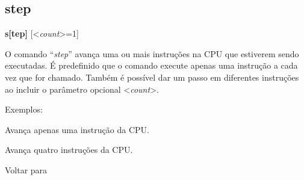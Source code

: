 \documentclass[letterpaper,10pt,brazil]{sphinxmanual}
\begin{document}
\subsection{step}
\label{debugger/execution:debugger-command-step}\label{debugger/execution:step}
\begin{DUlineblock}{0em}
\item[]
\begin{DUlineblock}{\DUlineblockindent}
\item[] \textbf{s{[}tep{]}} {[}\textless{}\emph{count}\textgreater{}=1{]}
\item[] 
\end{DUlineblock}
\item[] O comando ``\emph{step}'' avança uma ou mais instruções na CPU que estiverem sendo executadas. É predefinido que o comando execute apenas uma instrução a cada vez que for chamado. Também é possível dar um passo em diferentes instruções ao incluir o parâmetro opcional \textless{}\emph{count}\textgreater{}.
\item[] 
\item[] Exemplos:
\item[] 
\item[]
\begin{DUlineblock}{\DUlineblockindent}
\item[] 
\item[] 
\end{DUlineblock}
\item[] Avança apenas uma instrução da CPU.
\item[] 
\item[]
\begin{DUlineblock}{\DUlineblockindent}
\item[] 
\item[] 
\end{DUlineblock}
\item[] Avança quatro instruções da CPU.
\item[] 
\item[] Voltar para {\hyperref[debugger/execution:debugger\string-execution\string-list]{}}
\end{DUlineblock}
\begin{quote}
\label{debugger/execution:debugger-command-over}\end{quote}
\end{document}
